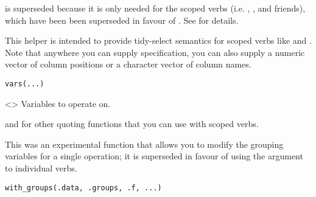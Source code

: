\documentclass[a4paper]{book}
\begin{document}
%
\begin{Description}
\strong{[Superseded]}

 is superseded because it is only needed for the scoped verbs (i.e.
, , and friends), which have been been
superseded in favour of . See  for details.

This helper is intended to provide tidy-select semantics for scoped verbs
like  and . Note that anywhere you can supply
 specification, you can also supply a numeric vector of column
positions or a character vector of column names.
\end{Description}
%
\begin{Usage}
\begin{verbatim}
vars(...)
\end{verbatim}
\end{Usage}
%
\begin{Arguments}
\begin{ldescription}
\item[\code{...}] <> Variables to operate on.
\end{ldescription}
\end{Arguments}
%
\begin{SeeAlso}
 and  for other quoting
functions that you can use with scoped verbs.
\end{SeeAlso}
%
\begin{Description}
\strong{[Superseded]}

This was an experimental function that allows you to modify the grouping
variables for a single operation; it is superseded in favour of using the
 argument to individual verbs.
\end{Description}
%
\begin{Usage}
\begin{verbatim}
with_groups(.data, .groups, .f, ...)
\end{verbatim}
\end{Usage}
%
\end{document}
